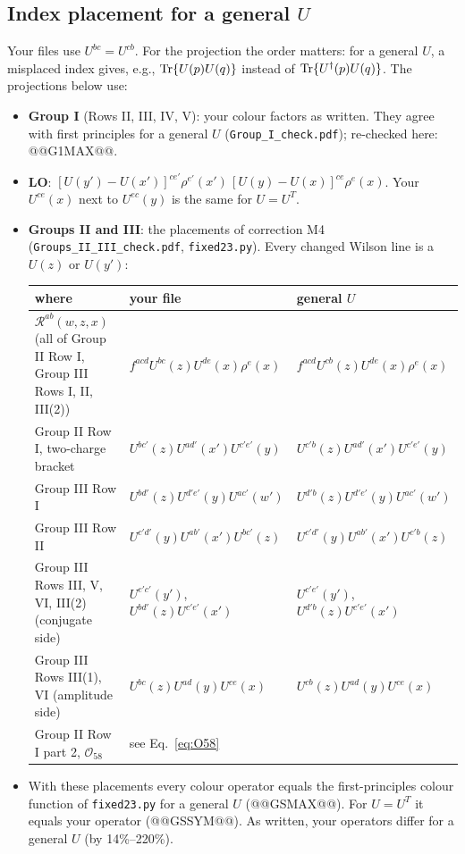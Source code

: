 \documentclass[10pt]{article}
\numberwithin{equation}{section}
\newcommand{\OO}{\mathcal O}
\begin{document}
\subsection{Index placement for a general \texorpdfstring{$U$}{U}}\label{sec:placement}
Your files use $U^{bc}=U^{cb}$. For the projection the order matters: for a general $U$, a misplaced index gives, e.g., ${\rm Tr}\{U(p)U(q)\}$ instead of ${\rm Tr}\{U^\dagger(p)U(q)\}$. The projections below use:
\begin{itemize}
\item \textbf{Group I} (Rows II, III, IV, V): your colour factors as written. They agree with first principles for a general $U$ (\texttt{Group\_I\_check.pdf}); re-checked here: @@G1MAX@@.
\item \textbf{LO}: $[U(y')-U(x')]^{ce'}\rho^{e'}(x')\,[U(y)-U(x)]^{ce}\rho^e(x)$. Your $U^{ce}(x)$ next to $U^{ec}(y)$ is the same for $U=U^T$.
\item \textbf{Groups II and III}: the placements of correction M4 (\texttt{Groups\_II\_III\_check.pdf}, \texttt{fixed23.py}). Every changed Wilson line is a $U(z)$ or $U(y')$:
\begin{center}\footnotesize
\begin{tabular}{@{}p{}ll@{}}\toprule
where & your file & general $U$\\\midrule
$\mathcal R^{ab}(w,z,x)$ (all of Group II Row I, Group III Rows I, II, III(2)) & $f^{acd}U^{bc}(z)U^{de}(x)\rho^e(x)$ & $f^{acd}U^{cb}(z)U^{de}(x)\rho^e(x)$\\
Group II Row I, two-charge bracket & $U^{bc'}(z)U^{ad'}(x')U^{c'e'}(y)$ & $U^{c'b}(z)U^{ad'}(x')U^{c'e'}(y)$\\
Group III Row I & $U^{bd'}(z)U^{d'e'}(y)U^{ac'}(w')$ & $U^{d'b}(z)U^{d'e'}(y)U^{ac'}(w')$\\
Group III Row II & $U^{c'd'}(y)U^{ab'}(x')U^{bc'}(z)$ & $U^{c'd'}(y)U^{ab'}(x')U^{c'b}(z)$\\
Group III Rows III, V, VI, III(2) (conjugate side) & $U^{e'c'}(y')$, $U^{bd'}(z)U^{c'e'}(x')$ & $U^{c'e'}(y')$, $U^{d'b}(z)U^{c'e'}(x')$\\
Group III Rows III(1), VI (amplitude side) & $U^{bc}(z)U^{ad}(y)U^{ce}(x)$ & $U^{cb}(z)U^{ad}(y)U^{ce}(x)$\\
Group II Row I part 2, $\OO_{58}$ & see Eq.~\eqref{eq:O58} & \\\bottomrule
\end{tabular}
\end{center}
\item With these placements every colour operator equals the first-principles colour function of \texttt{fixed23.py} for a general $U$ (@@GSMAX@@). For $U=U^T$ it equals your operator (@@GSSYM@@). As written, your operators differ for a general $U$ (by 14\%--220\%).

\end{itemize}
\end{document}
